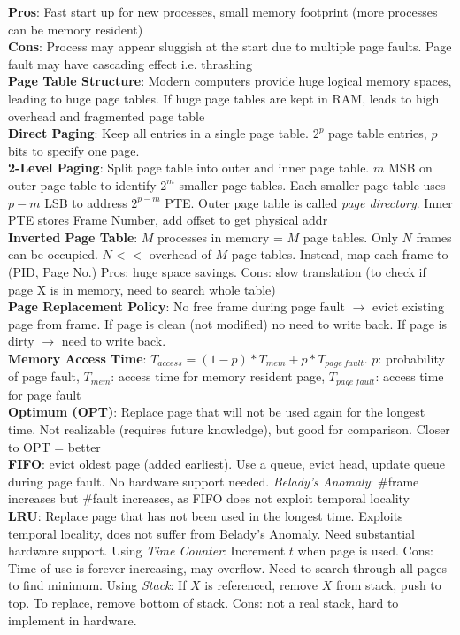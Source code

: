 \documentclass{article}
\begin{document}
{\begin{multicols*}{3}
\textbf{Pros}: Fast start up for new processes, small memory footprint (more processes can be memory resident) \\
\textbf{Cons}: Process may appear sluggish at the start due to multiple page faults. Page fault may have cascading effect i.e. thrashing\\
\textbf{Page Table Structure}: Modern computers provide huge logical memory spaces, leading to huge page tables. If huge page tables are kept in RAM, leads to high overhead and fragmented page table \\
\textbf{Direct Paging}: Keep all entries in a single page table. $2^p$ page table entries, $p$ bits to specify one page.\\
\textbf{2-Level Paging}: Split page table into outer and inner page table. $m$ MSB on outer page table to identify $2^m$ smaller page tables. Each smaller page table uses $p-m$ LSB to address $2^{p-m}$ PTE. Outer page table is called \textit{page directory}. Inner PTE stores Frame Number, add offset to get physical addr \\
\textbf{Inverted Page Table}: $M$ processes in memory = $M$ page tables. Only $N$ frames can be occupied. $N <<$ overhead of $M$ page tables. Instead, map each frame to (PID, Page No.) Pros: huge space savings. Cons: slow translation (to check if page X is in memory, need to search whole table)\\
\textbf{Page Replacement Policy}: No free frame during page fault $\to$ evict existing page from frame. If page is clean (not modified) no need to write back. If page is dirty $\to$ need to write back.\\
\textbf{Memory Access Time}: $T_{access}=(1-p)*T_{mem}+p*T_{page\ fault}$. $p$: probability of page fault, $T_{mem}$: access time for memory resident page, $T_{page\ fault}$: access time for page fault\\
\textbf{Optimum (OPT)}: Replace page that will not be used again for the longest time. Not realizable (requires future knowledge), but good for comparison. Closer to OPT = better\\
\textbf{FIFO}: evict oldest page (added earliest). Use a queue, evict head, update queue during page fault. No hardware support needed. \textit{Belady's Anomaly}: \#frame increases but \#fault increases, as FIFO does not exploit temporal locality\\
\textbf{LRU}: Replace page that has not been used in the longest time. Exploits temporal locality, does not suffer from Belady's Anomaly. Need substantial hardware support. Using \textit{Time Counter}: Increment $t$ when page is used. Cons: Time of use is forever increasing, may overflow. Need to search through all pages to find minimum. Using \textit{Stack}: If $X$ is referenced, remove $X$ from stack, push to top. To replace, remove bottom of stack. Cons: not a real stack, hard to implement in hardware. \\

\end{multicols*}}
\end{document}
